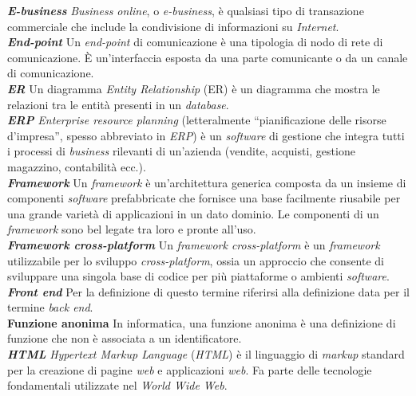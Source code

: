 \textbf{\textit{E-business}} \textit{Business online}, o \textit{e-business}, è qualsiasi tipo di transazione commerciale che include la condivisione di informazioni su \textit{Internet}.\\

\textbf{\textit{End-point}} Un \textit{end-point} di comunicazione è una tipologia di nodo di rete di comunicazione. È un'interfaccia esposta da una parte comunicante o da un canale di comunicazione.\\

\textbf{\textit{ER}} Un diagramma \textit{Entity Relationship} (ER) è un diagramma che mostra le relazioni tra le entità presenti in un \textit{database}.\\

\textbf{\textit{ERP}} \textit{Enterprise resource planning} (letteralmente ``pianificazione delle risorse d'impresa'', spesso abbreviato in \textit{ERP}) è un \textit{software} di gestione che integra tutti i processi di \textit{business} rilevanti di un'azienda (vendite, acquisti, gestione magazzino, contabilità ecc.).\\

\textbf{\textit{Framework}} Un \textit{framework} è un'architettura generica composta da un insieme di componenti \textit{software} prefabbricate che fornisce una base facilmente riusabile per una grande varietà di applicazioni in un dato dominio. Le componenti di un \textit{framework} sono bel legate tra loro e pronte all'uso.\\

\textbf{\textit{Framework cross-platform}} Un \textit{framework cross-platform} è un \textit{framework} utilizzabile per lo sviluppo \textit{cross-platform}, ossia un approccio che consente di sviluppare una singola base di codice per più piattaforme o ambienti \textit{software}.\\

\textbf{\textit{Front end}} Per la definizione di questo termine riferirsi alla definizione data per il termine \textit{back end}.\\

\textbf{Funzione anonima} In informatica, una funzione anonima è una definizione di funzione che non è associata a un identificatore.\\

\textbf{\textit{HTML}} \textit{Hypertext Markup Language} (\textit{HTML}) è il linguaggio di \textit{markup} standard per la creazione di pagine \textit{web} e applicazioni \textit{web}. Fa parte delle tecnologie fondamentali utilizzate nel \textit{World Wide Web}.\\

